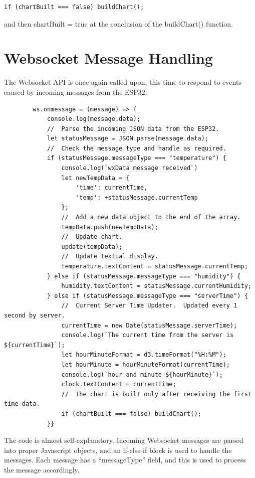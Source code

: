 \documentclass[oneside,letterpaper,12pt]{book}
\begin{document}
\begin{verbatim}
if (chartBuilt === false) buildChart();
\end{verbatim}

and then chartBuilt = true at the conclusion of the buildChart()
function.

\section{Websocket Message Handling}\label{websocket-message-handling}

The Websocket API is once again called upon, this time to respond to
events caused by incoming messages from the ESP32.

\begin{verbatim}
        ws.onmessage = (message) => {
            console.log(message.data);
            //  Parse the incoming JSON data from the ESP32.
            let statusMessage = JSON.parse(message.data);
            //  Check the message type and handle as required.
            if (statusMessage.messageType === "temperature") {
                console.log(`wxData message received`)
                let newTempData = {
                    'time': currentTime,
                    'temp': +statusMessage.currentTemp
                };
                //  Add a new data object to the end of the array.
                tempData.push(newTempData);
                //  Update chart.
                update(tempData);
                //  Update textual display.
                temperature.textContent = statusMessage.currentTemp;
            } else if (statusMessage.messageType === "humidity") {
                humidity.textContent = statusMessage.currentHumidity;
            } else if (statusMessage.messageType === "serverTime") {
                //  Current Server Time Updater.  Updated every 1 second by server.
                currentTime = new Date(statusMessage.serverTime);
                console.log(`The current time from the server is ${currentTime}`);
                let hourMinuteFormat = d3.timeFormat("%H:%M");
                let hourMinute = hourMinuteFormat(currentTime);
                console.log(`hour and minute ${hourMinute}`);
                clock.textContent = currentTime;
                //  The chart is built only after receiving the first time data.
                if (chartBuilt === false) buildChart();
            }}
\end{verbatim}

The code is almost self-explanatory. Incoming Websocket messages are
parsed into proper Javascript objects, and an if-else-if block is used
to handle the messages. Each message has a ``messageType'' field, and
this is used to process the message accordingly.
\end{document}
